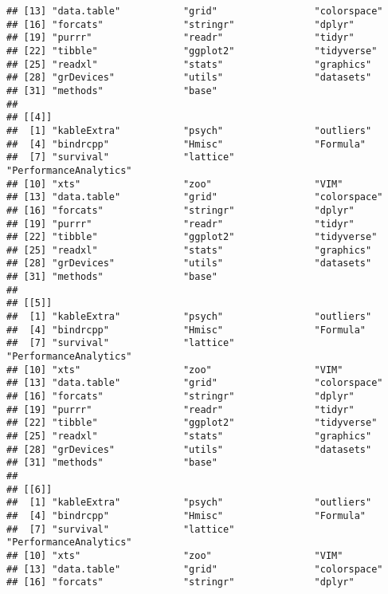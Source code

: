 \documentclass[]{article}
\begin{document}
\begin{verbatim}
## [13] "data.table"           "grid"                 "colorspace"          
## [16] "forcats"              "stringr"              "dplyr"               
## [19] "purrr"                "readr"                "tidyr"               
## [22] "tibble"               "ggplot2"              "tidyverse"           
## [25] "readxl"               "stats"                "graphics"            
## [28] "grDevices"            "utils"                "datasets"            
## [31] "methods"              "base"                
## 
## [[4]]
##  [1] "kableExtra"           "psych"                "outliers"            
##  [4] "bindrcpp"             "Hmisc"                "Formula"             
##  [7] "survival"             "lattice"              "PerformanceAnalytics"
## [10] "xts"                  "zoo"                  "VIM"                 
## [13] "data.table"           "grid"                 "colorspace"          
## [16] "forcats"              "stringr"              "dplyr"               
## [19] "purrr"                "readr"                "tidyr"               
## [22] "tibble"               "ggplot2"              "tidyverse"           
## [25] "readxl"               "stats"                "graphics"            
## [28] "grDevices"            "utils"                "datasets"            
## [31] "methods"              "base"                
## 
## [[5]]
##  [1] "kableExtra"           "psych"                "outliers"            
##  [4] "bindrcpp"             "Hmisc"                "Formula"             
##  [7] "survival"             "lattice"              "PerformanceAnalytics"
## [10] "xts"                  "zoo"                  "VIM"                 
## [13] "data.table"           "grid"                 "colorspace"          
## [16] "forcats"              "stringr"              "dplyr"               
## [19] "purrr"                "readr"                "tidyr"               
## [22] "tibble"               "ggplot2"              "tidyverse"           
## [25] "readxl"               "stats"                "graphics"            
## [28] "grDevices"            "utils"                "datasets"            
## [31] "methods"              "base"                
## 
## [[6]]
##  [1] "kableExtra"           "psych"                "outliers"            
##  [4] "bindrcpp"             "Hmisc"                "Formula"             
##  [7] "survival"             "lattice"              "PerformanceAnalytics"
## [10] "xts"                  "zoo"                  "VIM"                 
## [13] "data.table"           "grid"                 "colorspace"          
## [16] "forcats"              "stringr"              "dplyr"               

\end{verbatim}
\end{document}
